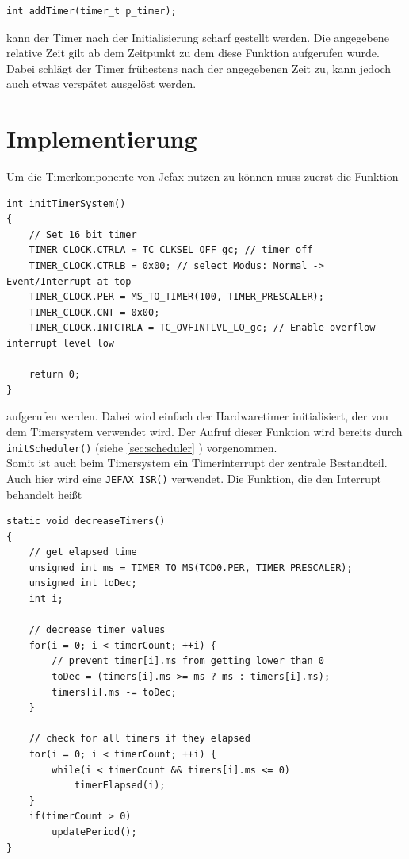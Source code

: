 \documentclass[fontsize=12pt, toc=bibliography, notitlepage]{scrreprt}
\newcommand{\refnn}[1]{\ref{#1} \nameref{#1}}
\begin{document}
\begin{lstlisting}[title=timer.h]
int addTimer(timer_t p_timer);
\end{lstlisting}

kann der Timer nach der Initialisierung scharf gestellt werden. Die angegebene relative Zeit gilt ab dem Zeitpunkt zu dem diese Funktion aufgerufen wurde. Dabei schlägt der Timer frühestens nach der angegebenen Zeit zu, kann jedoch auch etwas verspätet ausgelöst werden.

\newpage

\section{Implementierung}
\label{sec:timer-impl}
Um die Timerkomponente von Jefax nutzen zu können muss zuerst die Funktion

\begin{lstlisting}[title=timer.c]
int initTimerSystem()
{
	// Set 16 bit timer
	TIMER_CLOCK.CTRLA = TC_CLKSEL_OFF_gc; // timer off
	TIMER_CLOCK.CTRLB = 0x00; // select Modus: Normal -> Event/Interrupt at top
	TIMER_CLOCK.PER = MS_TO_TIMER(100, TIMER_PRESCALER);
	TIMER_CLOCK.CNT = 0x00;
	TIMER_CLOCK.INTCTRLA = TC_OVFINTLVL_LO_gc; // Enable overflow interrupt level low
	
	return 0;
}
\end{lstlisting}

aufgerufen werden. Dabei wird einfach der Hardwaretimer initialisiert, der von dem Timersystem verwendet wird. Der Aufruf dieser Funktion wird bereits durch \lstinline$initScheduler()$ (siehe \refnn{sec:scheduler}) vorgenommen.\\
Somit ist auch beim Timersystem ein Timerinterrupt der zentrale Bestandteil. Auch hier wird eine \lstinline$JEFAX_ISR()$ verwendet. Die Funktion, die den Interrupt behandelt heißt

\begin{lstlisting}[title=timer.c]
static void decreaseTimers()
{
	// get elapsed time
	unsigned int ms = TIMER_TO_MS(TCD0.PER, TIMER_PRESCALER);
	unsigned int toDec;
	int i;
	
	// decrease timer values
	for(i = 0; i < timerCount; ++i) {
		// prevent timer[i].ms from getting lower than 0
		toDec = (timers[i].ms >= ms ? ms : timers[i].ms);
		timers[i].ms -= toDec;
	}
	
	// check for all timers if they elapsed
	for(i = 0; i < timerCount; ++i) {
		while(i < timerCount && timers[i].ms <= 0)
			timerElapsed(i);
	}
	if(timerCount > 0)
		updatePeriod();
}
\end{lstlisting}
\end{document}
